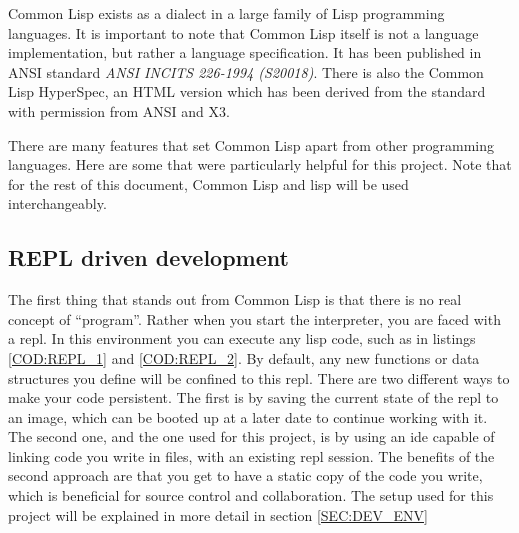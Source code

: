 
\label{SEC:CL}

Common Lisp exists as a dialect in a large family of Lisp programming languages.
It is important to note that Common Lisp itself is not a language implementation,
but rather a language specification.
It has been published in ANSI standard \textit{ANSI INCITS 226-1994 (S20018)}.
There is also the Common Lisp HyperSpec,
an HTML version which has been derived from the standard with permission from ANSI and X3.\cite{clhs}

There are many features that set Common Lisp apart from other programming languages.
Here are some that were particularly helpful for this project.
Note that for the rest of this document,
Common Lisp and lisp will be used interchangeably.

\subsection{REPL driven development}

The first thing that stands out from Common Lisp is that there is no real concept of ``program''.
Rather when you start the interpreter,
you are faced with a \ac{repl}.
In this environment you can execute any lisp code,
such as in listings \ref{COD:REPL_1} and \ref{COD:REPL_2}.
By default,
any new functions or data structures you define will be confined to this \ac{repl}.
There are two different ways to make your code persistent.
The first is by saving the current state of the \ac{repl} to an image,
which can be booted up at a later date to continue working with it.
The second one,
and the one used for this project,
is by using an \ac{ide} capable of linking code you write in files,
with an existing \ac{repl} session.
The benefits of the second approach are that you get to have a static copy of the code you write,
which is beneficial for source control and collaboration.
The setup used for this project will be explained in more detail in section \ref{SEC:DEV_ENV}



